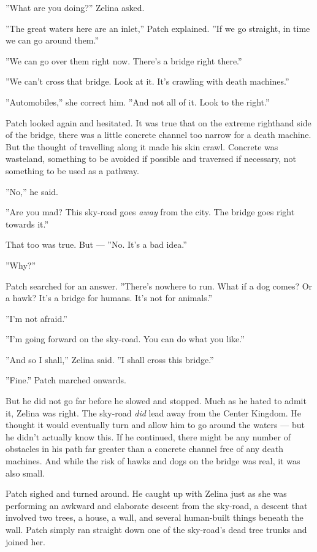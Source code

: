 \documentclass[12pt]{book}
\begin{document}
''What are you doing?'' Zelina asked.

''The great waters here are an inlet,'' Patch explained. ''If we go
straight, in time we can go around them.''

''We can go over them right now. There's a bridge right there.''

''We can't cross that bridge. Look at it. It's crawling with death
machines.''

''Automobiles,'' she correct him. ''And not all of it. Look to the
right.''

Patch looked again and hesitated. It was true that on the extreme
righthand side of the bridge, there was a little concrete channel too
narrow for a death machine. But the thought of travelling along it
made his skin crawl. Concrete was wasteland, something to be avoided
if possible and traversed if necessary, not something to be used as a
pathway.

''No,'' he said.

''Are you mad? This sky-road goes \textit{away} from the city. The
bridge goes right towards it.''

That too was true. But --- ''No. It's a bad idea.''

''Why?''

Patch searched for an answer. ''There's nowhere to run. What if a dog
comes? Or a hawk? It's a bridge for humans. It's not for animals.''

''I'm not afraid.''

''I'm going forward on the sky-road. You can do what you like.''

''And so I shall,'' Zelina said. ''I shall cross this bridge.''

''Fine.'' Patch marched onwards.

But he did not go far before he slowed and stopped. Much as he hated
to admit it, Zelina was right. The sky-road \textit{did} lead away
from the Center Kingdom. He thought it would eventually turn and allow
him to go around the waters --- but he didn't actually know this. If
he continued, there might be any number of obstacles in his path far
greater than a concrete channel free of any death machines. And while
the risk of hawks and dogs on the bridge was real, it was also small.

Patch sighed and turned around. He caught up with Zelina just as she
was performing an awkward and elaborate descent from the sky-road, a
descent that involved two trees, a house, a wall, and several
human-built things beneath the wall. Patch simply ran straight down
one of the sky-road's dead tree trunks and joined her.
\end{document}
